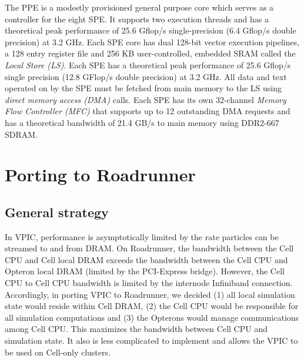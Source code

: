\documentclass[journal,twoside]{IEEEtran}
\begin{document}
The PPE is a modestly provisioned general purpose core
which serves as a controller for the eight SPE.  It supports two
execution threads and has a theoretical peak performance of 25.6
Gflop/s single-precision (6.4 Gflop/s double precision) at 3.2 GHz.
Each SPE core has dual 128-bit vector execution pipelines, a 128 entry
register file and 256 KB user-controlled, embedded SRAM called the
\emph{Local Store (LS)}.  Each SPE has a theoretical peak performance
of 25.6 Gflop/s single precision (12.8 GFlop/s double precision) at
3.2 GHz.  All data and text operated on by the SPE must be fetched
from main memory to the LS using \emph{direct memory access (DMA)}
calls.  Each SPE has its own 32-channel
\emph{Memory Flow Controller (MFC)} that supports up to 12 outstanding
DMA requests and has a theoretical bandwidth of 21.4 GB/s to main
memory using DDR2-667 SDRAM.



\section{Porting to Roadrunner}

\subsection{General strategy}

In VPIC, performance is asymptotically limited by the rate particles
can be streamed to and from DRAM.  On Roadrunner, the bandwidth
between the Cell CPU and Cell local DRAM exceeds the bandwidth between
the Cell CPU and Opteron local DRAM (limited by the PCI-Express
bridge).  However, the Cell CPU to Cell CPU bandwidth is limited by
the internode Infiniband connection.  Accordingly, in porting VPIC to
Roadrunner, we decided (1) all local simulation state would reside
within Cell DRAM, (2) the Cell CPU would be responsible for all
simulation computations and (3) the Opterons would manage
communications among Cell CPU.  This maximizes the bandwidth between
Cell CPU and simulation state.  It also is less complicated to
implement and allows the VPIC to be used on Cell-only clusters.
\end{document}
